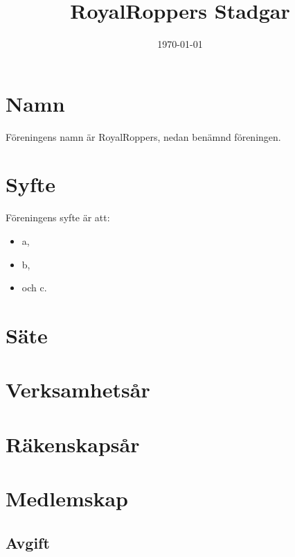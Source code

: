 \documentclass[a4paper,11pt]{article}
\title{RoyalRoppers Stadgar}
\date{\today}
\begin{document}
\maketitle
\newpage

\tableofcontents
\newpage

\section{Namn}
Föreningens namn är RoyalRoppers, nedan benämnd föreningen.

\section{Syfte}
Föreningens syfte är att:

\begin{itemize}
    \item a,
    \item b,
    \item och c.
\end{itemize}

\section{Säte}

\section{Verksamhetsår}

\section{Räkenskapsår}


\section{Medlemskap}

\subsection{Avgift}
\end{document}
